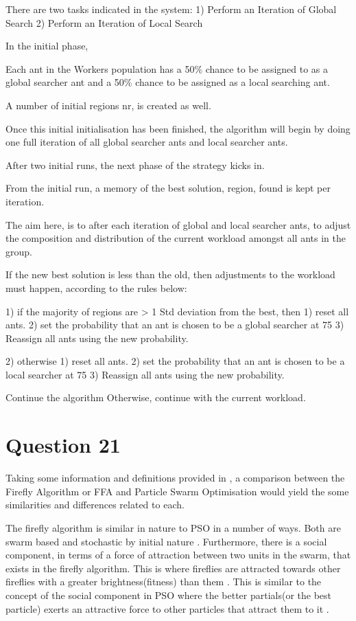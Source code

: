 \documentclass[12pt]{article}
\begin{document}
There are two tasks indicated in the system:
1) Perform an Iteration of Global Search
2) Perform an Iteration of Local Search

In the initial phase,

Each ant in the Workers population has a 50\% chance to be assigned to as a global searcher ant and a 50\% chance to be assigned as a local searching ant.

A number of initial regions nr, is created as well.

Once this initial initialisation has been finished, the algorithm will begin by doing one full iteration of all global searcher ants and local searcher ants.

After two initial runs, the next phase of the strategy kicks in.

From the initial run, a memory of the best solution, region, found is kept per iteration.

The aim here, is to after each iteration of global and local searcher ants, to adjust the composition and distribution of the current workload amongst all ants in the group.

If the new best solution is less than the old, then adjustments to the workload must happen, according to the rules below:

1) if the majority of regions are > 1 Std deviation from the best, then
   1) reset all ants.
   2) set the probability that an ant is chosen to be a global searcher at 75%
   3) Reassign all ants using the new probability.

2) otherwise
   1) reset all ants.
   2) set the probability that an ant is chosen to be a local searcher at 75%
   3) Reassign all ants using the new probability.

Continue the algorithm
Otherwise, continue with the current workload.
\section{Question 21}
Taking some information and definitions provided in \cite{Jones:2011:CFA:2023607.2023640}, a comparison between the Firefly Algorithm or FFA and Particle Swarm Optimisation would yield the some similarities and differences related to each.

The firefly algorithm is similar in nature to PSO in a number of ways. Both are swarm based and stochastic by initial nature \cite{kennedy95}. Furthermore, there is a social component, in terms of a force of attraction between two units in the swarm, that exists in the firefly algorithm. This is where fireflies are attracted towards other fireflies with a greater brightness(fitness) than them \cite{yang_2013}. This is similar to the concept of the social component in PSO where the better partials(or the best particle) exerts an attractive force to other particles that attract them to it \cite{kennedy95}.
\end{document}
